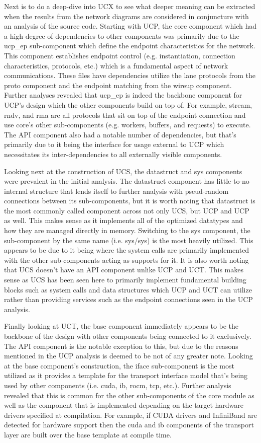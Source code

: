 Next is to do a deep-dive into UCX to see what deeper meaning can be extracted when the results from the network diagrams are considered in conjuncture with an analysis of the source code. Starting with UCP, the core component which had a high degree of dependencies to other components was primarily due to the ucp\_ep sub-component which define the endpoint characteristics for the network. This component establishes endpoint control (e.g. instantiation, connection characteristics, protocols, etc.) which is a fundamental aspect of network communications. These files have dependencies utilize the lane protocols from the proto component and the endpoint matching from the wireup component. Further analyses revealed that ucp\_ep is indeed the backbone component for UCP's design which the other components build on top of. For example, stream, rndv, and rma are all protocols that sit on top of the endpoint connection and use core's other sub-components (e.g. workers, buffers, and requests) to execute. The API component also had a notable number of dependencies, but that's primarily due to it being the interface for usage external to UCP which necessitates its inter-dependencies to all externally visible components.

Looking next at the construction of UCS, the datastruct and sys components were prevalent in the initial analysis. The datastruct component has little-to-no internal structure that lends itself to further analysis with pseud-random connections between its sub-components, but it is worth noting that datastruct is the most commonly called component across not only UCS, but UCP and UCP as well. This makes sense as it implements all of the optimized datatypes and how they are managed directly in memory. Switching to the sys component, the sub-component by the same name (i.e. sys/sys) is the most heavily utilized. This appears to be due to it being where the system calls are primarily implemented with the other sub-components acting as supports for it. It is also worth noting that UCS doesn't have an API component unlike UCP and UCT. This makes sense as UCS has been seen here to primarily implement fundamental building blocks such as system calls and data structures which UCP and UCT can utilize rather than providing services such as the endpoint connections seen in the UCP analysis.

Finally looking at UCT, the base component immediately appears to be the backbone of the design with other components being connected to it exclusively. The API component is the notable exception to this, but due to the reasons mentioned in the UCP analysis is deemed to be not of any greater note. Looking at the base component's construction, the iface sub-component is the most utilized as it provides a template for the transport interface model that's being used by other components (i.e. cuda, ib, rocm, tcp, etc.). Further analysis revealed that this is common for the other sub-components of the core module as well as the component that is implemented depending on the target hardware drivers specified at compilation. For example, if CUDA drivers and InfiniBand are detected for hardware support then the cuda and ib components of the transport layer are built over the base template at compile time.

